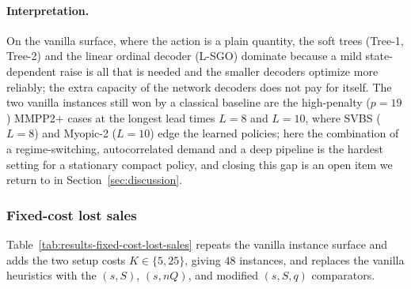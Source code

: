 \documentclass[11pt]{article}
\begin{document}
\paragraph{Interpretation.}
On the vanilla surface, where the action is a plain quantity, the soft trees (Tree-1, Tree-2) and the
linear ordinal decoder (L-SGO) dominate because a mild state-dependent raise is all that is needed and
the smaller decoders optimize more reliably; the extra capacity of the network decoders does not pay
for itself. The two vanilla instances still won by a classical baseline are the high-penalty
($p=19$) MMPP2$+$ cases at the longest lead times $L=8$ and $L=10$, where SVBS ($L=8$) and Myopic-2
($L=10$) edge the learned policies; here the combination of a regime-switching, autocorrelated demand
and a deep pipeline is the hardest setting for a stationary compact policy, and closing this gap is
an open item we return to in Section~\ref{sec:discussion}.

\subsubsection{Fixed-cost lost sales}
\label{sec:lostsales-results-fixed-cost}

Table~\ref{tab:results-fixed-cost-lost-sales} repeats the vanilla instance surface and adds the two
setup costs $K\in\{5,25\}$, giving $48$ instances, and replaces the vanilla heuristics with the
$(s,S)$, $(s,nQ)$, and modified $(s,S,q)$ comparators.
\end{document}
